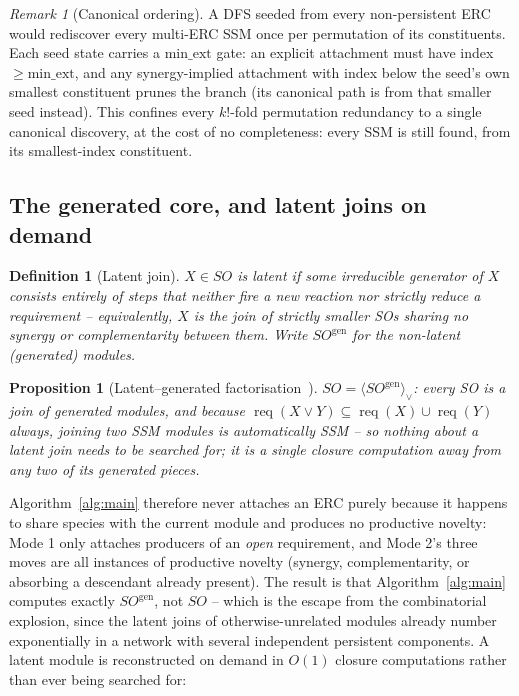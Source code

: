 \documentclass[11pt]{article}
\theoremstyle{plain}
\newtheorem{definition}{Definition}
\newtheorem{proposition}{Proposition}
\theoremstyle{remark}
\newtheorem{remark}{Remark}
\newcommand{\req}{\operatorname{req}}
\newcommand{\js}{\vee}
\newcommand{\SO}{\mathit{SO}}
\newcommand{\SOgen}{\mathit{SO}^{\mathrm{gen}}}
\begin{document}
\begin{remark}[Canonical ordering]
\label{rem:canon}
A DFS seeded from every non-persistent ERC would rediscover every
multi-ERC SSM once per permutation of its constituents. Each seed state
carries a $\mathrm{min\_ext}$ gate: an explicit attachment must have index
$\geq\mathrm{min\_ext}$, and any synergy-implied attachment with index
below the seed's own smallest constituent prunes the branch (its
canonical path is from that smaller seed instead). This confines every
$k!$-fold permutation redundancy to a single canonical discovery, at the
cost of no completeness: every SSM is still found, from its smallest-index
constituent.
\end{remark}

\subsection{The generated core, and latent joins on demand}

\begin{definition}[Latent join]
$X\in\SO$ is \emph{latent} if some irreducible generator of $X$ consists
entirely of steps that neither fire a new reaction nor strictly reduce a
requirement -- equivalently, $X$ is the join of strictly smaller SOs
sharing no synergy or complementarity between them. Write $\SOgen$ for the
non-latent (\emph{generated}) modules.
\end{definition}

\begin{proposition}[Latent--generated factorisation~\cite{BMBcompanion}]
$\SO=\langle\SOgen\rangle_\js$: every SO is a join of generated modules,
and because $\req(X\js Y)\subseteq\req(X)\cup\req(Y)$ always, joining two
SSM modules is automatically SSM -- so nothing about a latent join needs
to be searched for; it is a single closure computation away from any two
of its generated pieces.
\end{proposition}

Algorithm~\ref{alg:main} therefore never attaches an ERC purely because it
happens to share species with the current module and produces no
productive novelty: Mode 1 only attaches producers of an \emph{open}
requirement, and Mode 2's three moves are all instances of productive
novelty (synergy, complementarity, or absorbing a descendant already
present). The result is that Algorithm~\ref{alg:main} computes exactly
$\SOgen$, not $\SO$ -- which is the escape from the combinatorial
explosion, since the latent joins of otherwise-unrelated modules already
number exponentially in a network with several independent persistent
components. A latent module is reconstructed on demand in $O(1)$ closure
computations rather than ever being searched for:
\end{document}
